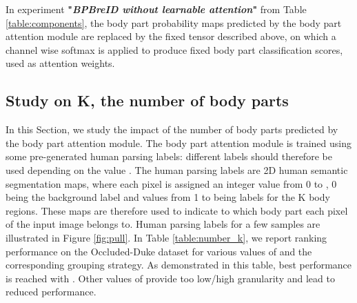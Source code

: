 \documentclass[10pt,twocolumn,letterpaper]{article}
\begin{document}
In experiment \textbf{"\textit{BPBreID without learnable attention}"} from Table \ref{table:components}, the  body part probability maps  predicted by the body part attention module are replaced by the fixed tensor  described above, on which a channel wise softmax is applied to produce fixed body part classification scores, used as attention weights. 



\subsection*{Study on K, the number of body parts} \label{section:number_k}


In this Section, we study the impact of the number  of body parts predicted by the body part attention module.
The body part attention module is trained using some pre-generated human parsing labels: different labels should therefore be used depending on the value .
The human parsing labels are 2D human semantic segmentation maps, where each pixel is assigned an integer value from 0 to , 0 being the background label and values from 1 to  being labels for the K body regions.
These maps are therefore used to indicate to which body part each pixel of the input image belongs to.
Human parsing labels for a few samples are illustrated in Figure \ref{fig:pull}.
In Table \ref{table:number_k}, we report ranking performance on the Occluded-Duke dataset for various values of  and the corresponding grouping strategy.
As demonstrated in this table, best performance is reached with .
Other values of  provide too low/high granularity and lead to reduced performance.
\end{document}
